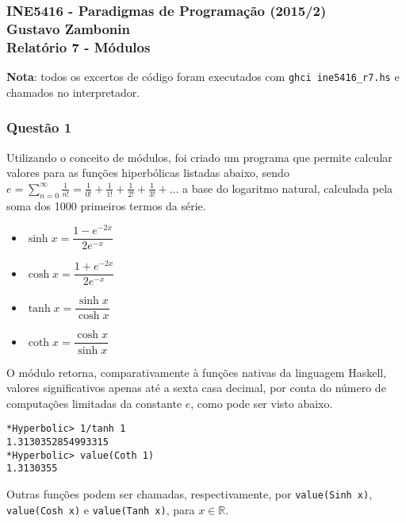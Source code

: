 \documentclass{article}
\begin{document}
\subsubsection*{INE5416 - Paradigmas de Programação (2015/2) \\
    Gustavo Zambonin \\
    Relatório 7 - Módulos
}

\textbf{Nota}: todos os excertos de código foram executados com
\texttt{ghci ine5416\_r7.hs} e chamados no interpretador.

\subsubsection*{Questão 1}
Utilizando o conceito de módulos, foi criado um programa que
permite calcular valores para as funções hiperbólicas listadas abaixo,
sendo $e = \sum\limits_{n=0}^\infty \frac{1}{n!} = \frac{1}{0!} +
\frac{1}{1!} + \frac{1}{2!} + \frac{1}{3!} + \dots$ a base do logaritmo
natural, calculada pela soma dos 1000 primeiros termos da série.
\begin{itemize}
    \item $\sinh x = \dfrac{1 - e^{-2x}}{2e^{-x}}$
    \item $\cosh x = \dfrac{1 + e^{-2x}}{2e^{-x}}$
    \item $\tanh x = \dfrac{\sinh x}{\cosh x}$
    \item $\coth x = \dfrac{\cosh x}{\sinh x}$
\end{itemize}
O módulo retorna, comparativamente à funções nativas da linguagem Haskell,
valores significativos apenas até a sexta casa decimal, por conta do
número de computações limitadas da constante $e$, como pode ser
visto abaixo.

\begin{verbatim}
*Hyperbolic> 1/tanh 1
1.3130352854993315
*Hyperbolic> value(Coth 1)
1.3130355
\end{verbatim}
Outras funções podem ser chamadas, respectivamente, por
\texttt{value(Sinh x)}, \texttt{value(Cosh x)} e \texttt{value(Tanh x)},
para $x \in \mathbb{R}$. 
\end{document}
